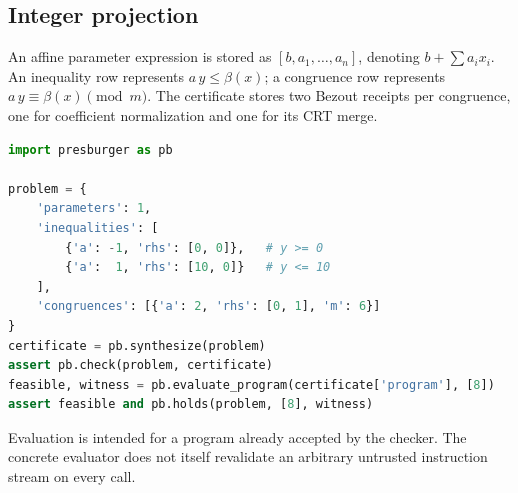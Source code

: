\subsection{Integer projection}
An affine parameter expression is stored as
$[b,a_1,\ldots,a_n]$, denoting $b+\sum a_ix_i$. An inequality row represents
$a\,y\le\beta(x)$; a congruence row represents
$a\,y\equiv\beta(x)\pmod m$. The certificate stores two Bezout receipts per
congruence, one for coefficient normalization and one for its CRT merge.

\begin{lstlisting}[language=Python]
import presburger as pb

problem = {
    'parameters': 1,
    'inequalities': [
        {'a': -1, 'rhs': [0, 0]},   # y >= 0
        {'a':  1, 'rhs': [10, 0]}   # y <= 10
    ],
    'congruences': [{'a': 2, 'rhs': [0, 1], 'm': 6}]
}
certificate = pb.synthesize(problem)
assert pb.check(problem, certificate)
feasible, witness = pb.evaluate_program(certificate['program'], [8])
assert feasible and pb.holds(problem, [8], witness)
\end{lstlisting}
Evaluation is intended for a program already accepted by the checker. The
concrete evaluator does not itself revalidate an arbitrary untrusted instruction
stream on every call.

